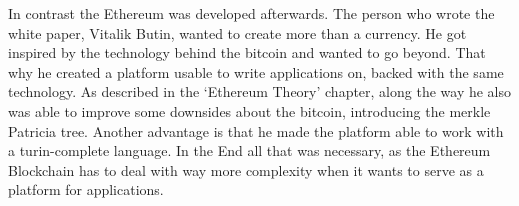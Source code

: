 In contrast the Ethereum was developed afterwards. The person who wrote the white paper, Vitalik Butin, wanted to create more than a currency. He got inspired by the technology behind the bitcoin and wanted to go beyond. That why he created a platform usable to write applications on, backed with the same technology. 
As described in the ‘Ethereum Theory’ chapter, along the way he also was able to improve some downsides about the bitcoin, introducing the merkle Patricia tree. Another advantage is that he made the platform able to work with a turin-complete language. In the End all that was necessary, as the Ethereum Blockchain has to deal with way more complexity when it wants to serve as a platform for applications.
